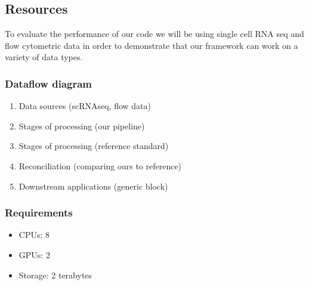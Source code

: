 \documentclass[11pt,letterpaper]{article}
\begin{document}
\subsection{Resources}

To evaluate the performance of our code we will be using single cell RNA seq and flow cytometric data in order to demonstrate that our framework can work on a variety of data types. 

\subsubsection{Dataflow diagram}

\begin{enumerate}
\item Data sources (scRNAseq, flow data)
\item Stages of processing (our pipeline)
\item Stages of processing (reference standard)
\item Reconciliation (comparing ours to reference)
\item Downstream applications (generic block)
\end{enumerate}

\subsubsection{Requirements}

\begin{itemize}
    \item CPUs: 8
    \item GPUs: 2
    \item Storage: 2 terabytes
\end{itemize}
\printbibliography
\end{document}
